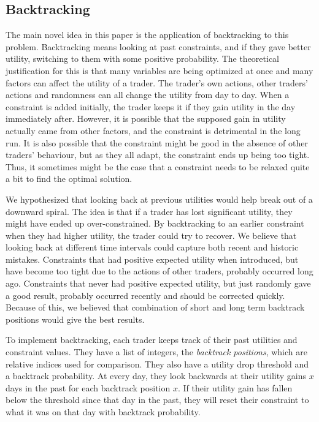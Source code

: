 \documentclass[12pt,a4paper,titlepage]{article}
\begin{document}
\subsection{Backtracking}\label{backtrack}

The main novel idea in this paper is the application of backtracking to this problem.
Backtracking means looking at past constraints, and if they gave better utility, switching to them with some positive probability.
The theoretical justification for this is that many variables are being optimized at once and many factors can affect the utility of a trader.
The trader's own actions, other traders' actions and randomness can all change the utility from day to day.
When a constraint is added initially, the trader keeps it if they gain utility in the day immediately after.
However, it is possible that the supposed gain in utility actually came from other factors, and the constraint is detrimental in the long run.
It is also possible that the constraint might be good in the absence of other traders' behaviour, but as they all adapt, the constraint ends up being too tight.
Thus, it sometimes might be the case that a constraint needs to be relaxed quite a bit to find the optimal solution.


We hypothesized that looking back at previous utilities would help break out of a downward spiral.
The idea is that if a trader has lost significant utility, they might have ended up over-constrained.
By backtracking to an earlier constraint when they had higher utility, the trader could try to recover.
We believe that looking back at different time intervals could capture both recent and historic mistakes.
Constraints that had positive expected utility when introduced, but have become too tight due to the actions of other traders, probably occurred long ago.
Constraints that never had positive expected utility, but just randomly gave a good result, probably occurred recently and should be corrected quickly.
Because of this, we believed that combination of short and long term backtrack positions would give the best results.

To implement backtracking, each trader keeps track of their past utilities and constraint values.
They have a list of integers, the \textit{backtrack positions}, which are relative indices used for comparison.
They also have a utility drop threshold and a backtrack probability.
At every day, they look backwards at their utility gains $x$ days in the past for each backtrack position $x$.
If their utility gain has fallen below the threshold since that day in the past, they will reset their constraint to what it was on that day with backtrack probability.
\end{document}
